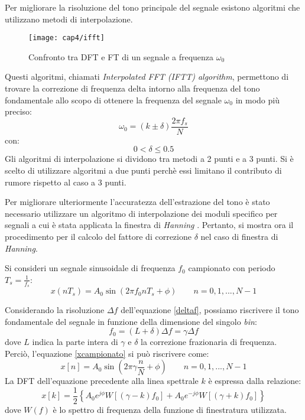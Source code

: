 Per migliorare la risoluzione del tono principale del segnale esistono algoritmi che utilizzano metodi di interpolazione.
\begin{figure}  
  \begin{center}
    \texttt{[image: cap4/ifft]}
    \caption{Confronto tra DFT e FT di un segnale a frequenza $\omega _0$}
    \label{ifft}
  \end{center}
\end{figure}

Questi algoritmi, chiamati \textit{Interpolated FFT (IFTT) algorithm}, permettono di trovare la correzione di frequenza delta intorno alla frequenza del tono fondamentale allo scopo di ottenere la frequenza del segnale $\omega _0$  in modo più preciso:	
\begin{equation}
	\omega _0 = (k \pm \delta)\frac{2 \pi f_s}{N}
\end{equation}
con:
$$ 0 < \delta \leq 0.5$$
Gli algoritmi di interpolazione si dividono tra metodi a 2 punti e a 3 punti. Si è scelto di utilizzare algoritmi a due punti perchè essi limitano il contributo di rumore rispetto al caso a 3 punti. 

Per migliorare ulteriormente l'accuratezza dell'estrazione del tono è stato necessario utilizzare un algoritmo di interpolazione dei moduli specifico per segnali a cui è stata applicata la finestra di \textit{Hanning} \cite{1007077}. Pertanto, si mostra ora il procedimento per il calcolo del fattore di correzione $\delta$ nel caso di finestra di \textit{Hanning}.

Si consideri un segnale sinusoidale di frequenza $f_0$ campionato con periodo $T_s=\frac{1}{f_s}$:
\begin{equation}
	x(nT_s)=A_0 \sin ( 2 \pi f_0 n T_s + \phi ) \qquad n=0,1,...,N-1
	\label{xcampionato}
\end{equation}

Considerando la risoluzione $\Delta f $ dell'equazione \ref{deltaf}, possiamo riscrivere il tono fondamentale del segnale in funzione della dimensione del singolo \textit{bin}:
\begin{equation}
	f_0 = (L+\delta)\Delta f = \gamma \Delta f
\end{equation}
dove $L$ indica la parte intera di $\gamma$ e $\delta$ la correzione frazionaria di frequenza. Perciò, l'equazione \ref{xcampionato} si può riscrivere come:
\begin{equation}
	x[n]=A_0 \sin ( 2 \pi \gamma \frac{n}{N} + \phi ) \qquad n=0,1,...,N-1
\end{equation}
La DFT dell'equazione precedente alla linea spettrale $k$ è espressa dalla relazione:
\begin{equation}
	x[k] = \frac{1}{2} \left \{ A_0 e^{j\phi} W[(\gamma -k)f_0] + A_0 e^{-j\phi}W[(\gamma + k)f_0]  \right \}
\end{equation}
dove $W(f)$ è lo spettro di frequenza della funzione di finestratura utilizzata.

